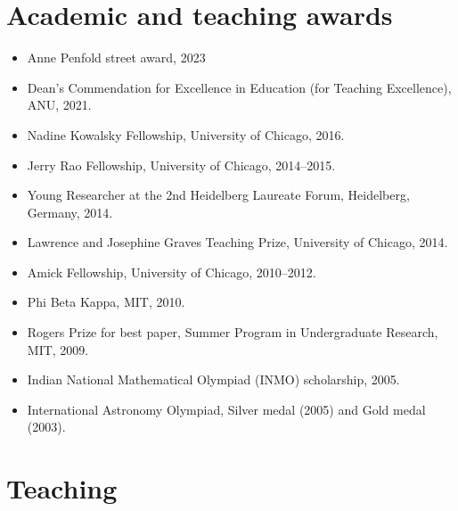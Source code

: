 \documentclass[a4paper]{moderncv}
\begin{document}
\section*{Academic and teaching awards}
\label{sec:org926bb22}
\begin{itemize}
\item Anne Penfold street award, 2023
\item Dean's Commendation for Excellence in Education (for Teaching Excellence), ANU, 2021.
\item Nadine Kowalsky Fellowship, University of Chicago, 2016.
\item Jerry Rao Fellowship, University of Chicago, 2014--2015.
\item Young Researcher at the 2nd Heidelberg Laureate Forum, Heidelberg, Germany, 2014.
\item Lawrence and Josephine Graves Teaching Prize, University of Chicago, 2014.
\item Amick Fellowship, University of Chicago, 2010--2012.
\item Phi Beta Kappa, MIT, 2010.
\item Rogers Prize for best paper, Summer Program in Undergraduate Research, MIT, 2009.
\item Indian National Mathematical Olympiad (INMO) scholarship, 2005.
\item International Astronomy Olympiad, Silver medal (2005) and Gold medal (2003).
\end{itemize}

\section*{Teaching}
\label{sec:org42a5b5d}
\end{document}
